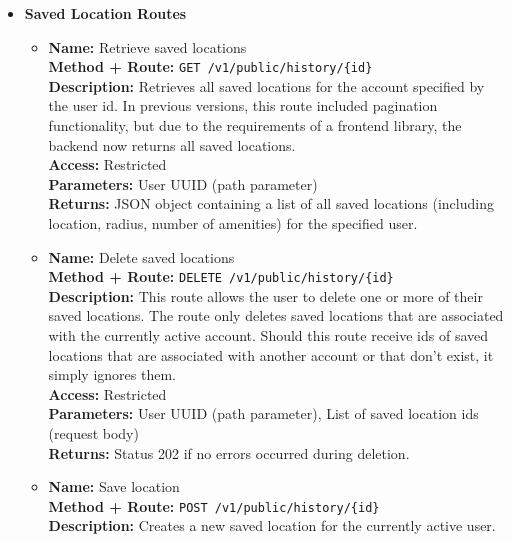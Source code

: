 \begin{itemize}
{\begin{itemize}
{        }
    \end{itemize}
  }
  \item{
    \textbf{Saved Location Routes}
    \begin{itemize}
      \item {
        \textbf{Name:} Retrieve saved locations\\
        \textbf{Method + Route:} \texttt{GET /v1/public/history/\{id\}}\\
        \textbf{Description:} Retrieves all saved locations for the account
        specified by the user id. In previous versions, this route included
        pagination functionality, but due to the requirements of a frontend
        library, the backend now returns all saved locations.\\
        \textbf{Access:} Restricted\\
        \textbf{Parameters:} User UUID (path parameter)\\
        \textbf{Returns:} JSON object containing a list of all saved locations
        (including location, radius, number of amenities) for the specified
        user.\\
      }
      \item {
        \textbf{Name:} Delete saved locations\\
        \textbf{Method + Route:} \texttt{DELETE /v1/public/history/\{id\}}\\
        \textbf{Description:} This route allows the user to delete one or more
        of their saved locations. The route only deletes saved locations that
        are associated with the currently active account. Should this route
        receive ids of saved locations that are associated with another account
        or that don't exist, it simply ignores them.\\
        \textbf{Access:} Restricted\\
        \textbf{Parameters:} User UUID (path parameter), List of saved location
        ids (request body)\\
        \textbf{Returns:} Status 202 if no errors occurred during deletion.\\
      }
      \item {
        \textbf{Name:} Save location\\
        \textbf{Method + Route:} \texttt{POST /v1/public/history/\{id\}}\\
        \textbf{Description:} Creates a new saved location for the currently
        active user.\\
}
\end{itemize}}
\end{itemize}
